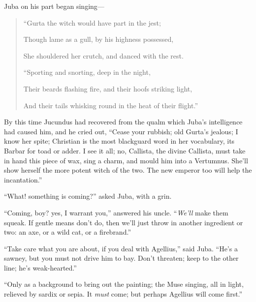 Juba on his part began singing—

\begin{quote}

``Gurta the witch would have part in the jest;

Though lame as a gull, by his highness possessed,

She shouldered her crutch, and danced with the rest.

``Sporting and snorting, deep in the night,

Their beards flashing fire, and their hoofs striking light,

And their tails whisking round in the heat of their flight.''

\end{quote}

By this time Jucundus had recovered from the qualm which Juba's
intelligence had caused him, and he cried out, ``Cease your
rubbish; old Gurta's jealous; I know her spite; Christian is the most
blackguard word in her vocabulary, its Barbar for toad or adder. I see
it all; no, Callista, the divine Callista, must take in hand this
piece of wax, sing a charm, and mould him into a Vertumnus. She'll
show herself the more potent witch of the two. The new emperor
too will help the incantation.''

``What! something is coming?'' asked Juba, with a grin.

``Coming, boy? yes, I warrant you,'' answered his uncle.
``\emph{We'll} make them squeak. If gentle means don't do, then we'll
just throw in another ingredient or two: an axe, or a wild cat, or a
firebrand.''

``Take care what you are about, if you deal with Agellius,''
said Juba. ``He's a sawney, but you must not drive him to bay. Don't
threaten; keep to the other line; he's weak-hearted.''

``Only as a background to bring out the painting; the Muse
singing, all in light, relieved by sardix or sepia. It \emph{must} come; but
perhaps Agellius will come first.''

